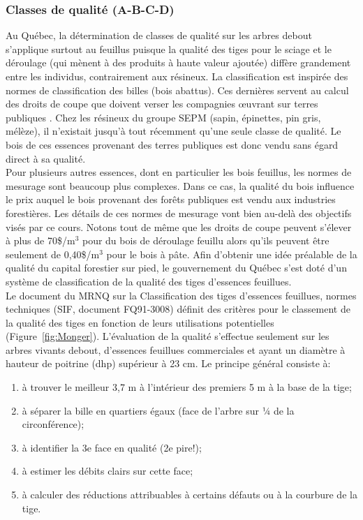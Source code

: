 \subsubsection{Classes de qualité (A-B-C-D)}
Au Québec, la détermination de classes de qualité sur les arbres debout s'applique surtout au feuillus puisque la \og qualité \fg des tiges pour le sciage et le déroulage (qui mènent à des produits à haute valeur ajoutée) diffère grandement entre les individus, contrairement aux résineux. La classification est inspirée des normes de classification des billes (bois abattus). Ces dernières servent au calcul des droits de coupe que doivent verser les compagnies œuvrant sur terres publiques \citep{MRNF2009taux}. Chez les résineux du groupe SEPM (sapin, épinettes, pin gris, mélèze), il n'existait jusqu'à tout récemment qu'une seule classe de qualité. Le bois de ces essences provenant des terres publiques est donc vendu sans égard direct à sa qualité.\\ 

Pour plusieurs autres essences, dont en particulier les bois feuillus, les normes de mesurage sont beaucoup plus complexes. Dans ce cas, la qualité du bois influence le prix auquel le bois provenant des forêts publiques est vendu aux industries forestières. Les détails de ces normes de mesurage vont bien au-delà des objectifs visés par ce cours. Notons tout de même que les droits de coupe peuvent s'élever à plus de 70\$/m$^3$ pour du bois de déroulage feuillu alors qu'ils peuvent être seulement de 0,40\$/m$^3$ pour le bois à pâte. Afin d'obtenir une idée préalable de la qualité du capital forestier sur pied, le gouvernement du Québec s'est doté d'un système de classification de la qualité des tiges d'essences feuillues.\\

Le document du MRNQ sur la Classification des tiges d'essences feuillues, normes techniques (SIF, document FQ91-3008) définit des critères pour le classement de la qualité des tiges en fonction de leurs utilisations potentielles (Figure~\ref{fig:Monger}). L'évaluation de la qualité s'effectue seulement sur les arbres vivants debout, d'essences feuillues commerciales et ayant un diamètre à hauteur de poitrine (dhp) supérieur à 23 cm. Le principe général consiste à:

\begin{enumerate}
	\item à trouver le meilleur 3,7 m à l'intérieur des premiers 5 m à la base de la tige;
	\item à séparer la bille en quartiers égaux (face de l'arbre sur ¼ de la circonférence);
	\item à identifier la 3e face en qualité (2e pire!);
	\item à estimer les débits clairs sur cette face;
	\item à calculer des réductions attribuables à certains défauts ou à la courbure de la tige.
\end{enumerate}	

